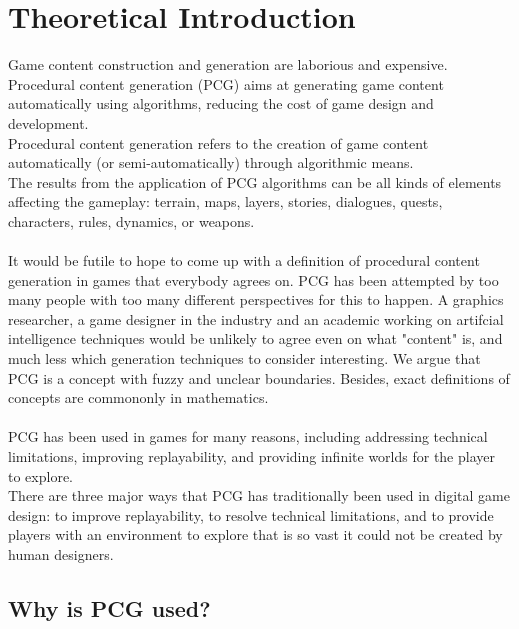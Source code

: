 \documentclass[MGS,Master,english]{twbook}%
\begin{document}
\section{Theoretical Introduction}
\cite{pcg::PCGinGameIndustry} Game content construction and generation are laborious and expensive. Procedural content generation (PCG) aims at generating game content automatically using algorithms, reducing the cost of game design and development.\\
Procedural content generation refers to the creation of game content automatically (or semi-automatically) through algorithmic means.\\
The results from the application of PCG algorithms can be all kinds of elements affecting the gameplay: terrain, maps, layers, stories, dialogues, quests, characters, rules, dynamics, or weapons.\\
\\
It would be futile to hope to come up with a definition of procedural content generation in games that everybody agrees on. PCG has been attempted by too many people with too many different perspectives for this to happen. A graphics researcher, a game designer in the industry and an academic working on artifcial intelligence techniques would be unlikely to agree even on what "content" is, and much less which generation techniques to consider interesting. We argue that PCG is a concept with fuzzy and unclear boundaries. Besides, exact definitions of concepts are commononly in mathematics. \cite{pcg::whatIsPCG}\\
\\
PCG has been used in games for many reasons, including addressing technical limitations, improving replayability, and providing infinite worlds for the player to explore. \cite{pcg::endlessWeb}\\
There are three major ways that PCG has traditionally been used in digital game design: to improve replayability, to resolve technical limitations, and to provide players with an environment to explore that is so vast it could not be created by human designers.\cite{pcg::endlessWeb}

\subsection{Why is PCG used?}
\end{document}
